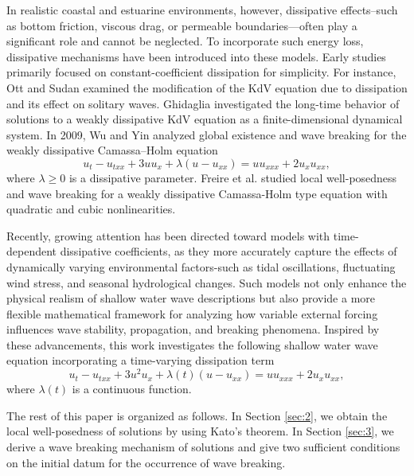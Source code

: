 \documentclass[preprint,12pt]{elsarticle}
\numberwithin{equation}{section}
\begin{document}
In realistic coastal and estuarine environments, however, dissipative effects--such as bottom friction, viscous drag, or permeable boundaries---often play a significant role and cannot be neglected. To incorporate such energy loss, dissipative mechanisms have been introduced into these models. Early studies primarily focused on constant-coefficient dissipation for simplicity. For instance, Ott and Sudan \cite{Ott1970} examined the modification of the KdV equation due to dissipation and its effect on solitary waves. Ghidaglia \cite{Ghidaglia1988} investigated the long-time behavior of solutions to a weakly dissipative KdV equation as a finite-dimensional dynamical system. In 2009, Wu and Yin \cite{Wu2009} analyzed global existence and wave breaking for the weakly dissipative Camassa--Holm equation
\begin{equation}
    u_t - u_{txx} + 3u u_x + \lambda (u - u_{xx}) = u u_{xxx} + 2 u_x u_{xx},
    \label{102}
\end{equation}
where \(\lambda \geq 0\) is a dissipative parameter. Freire et al. \cite{Freire1} studied local well-posedness and wave breaking for a weakly dissipative Camassa-Holm type equation with quadratic and cubic nonlinearities.

Recently, growing attention has been directed toward models with time-dependent dissipative coefficients, as they more accurately capture the effects of dynamically varying environmental factors-such as tidal oscillations, fluctuating wind stress, and seasonal hydrological changes. Such models not only enhance the physical realism of shallow water wave descriptions but also provide a more flexible mathematical framework for analyzing how variable external forcing influences wave stability, propagation, and breaking phenomena.
Inspired by these advancements, this work investigates the following shallow water wave equation incorporating a time-varying dissipation term
\begin{equation}
    u_t - u_{txx} + 3u^2 u_x + \lambda(t)(u - u_{xx}) = u u_{xxx} + 2 u_x u_{xx},
    \label{103}
\end{equation}
where \(\lambda(t)\) is a continuous function.

The rest of this paper is organized as follows. In Section \ref{sec:2}, we obtain the local well-posedness of solutions by using Kato's theorem. In Section \ref{sec:3}, we derive a wave breaking mechanism of solutions and give two sufficient conditions on the initial datum for the occurrence of wave breaking.
\end{document}
